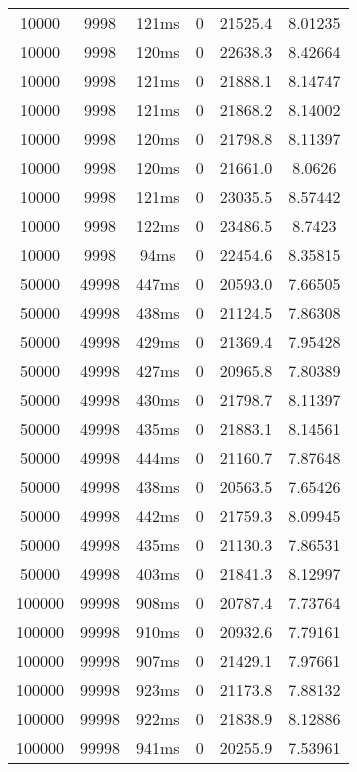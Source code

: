 \documentclass[./main.tex]{subfiles}
\begin{document}
\begin{table}
\begin{tabular}{ c | c | c | c | c | c }
        10000 & 9998 & 121ms & 0 & 21525.4 & 8.01235 \\
        10000 & 9998 & 120ms & 0 & 22638.3 & 8.42664 \\
        10000 & 9998 & 121ms & 0 & 21888.1 & 8.14747 \\
        10000 & 9998 & 121ms & 0 & 21868.2 & 8.14002 \\
        10000 & 9998 & 120ms & 0 & 21798.8 & 8.11397 \\
        10000 & 9998 & 120ms & 0 & 21661.0 & 8.0626 \\
        10000 & 9998 & 121ms & 0 & 23035.5 & 8.57442 \\
        10000 & 9998 & 122ms & 0 & 23486.5 & 8.7423 \\
        \rowcolor{lightgray} 10000 & 9998 & 94ms & 0 & 22454.6 & 8.35815 \\
        \hline
        50000 & 49998 & 447ms & 0 & 20593.0 & 7.66505 \\
        50000 & 49998 & 438ms & 0 & 21124.5 & 7.86308 \\
        50000 & 49998 & 429ms & 0 & 21369.4 & 7.95428 \\
        50000 & 49998 & 427ms & 0 & 20965.8 & 7.80389 \\
        50000 & 49998 & 430ms & 0 & 21798.7 & 8.11397 \\
        50000 & 49998 & 435ms & 0 & 21883.1 & 8.14561 \\
        \rowcolor{lightgray} 50000 & 49998 & 444ms & 0 & 21160.7 & 7.87648 \\
        50000 & 49998 & 438ms & 0 & 20563.5 & 7.65426 \\
        50000 & 49998 & 442ms & 0 & 21759.3 & 8.09945 \\
        50000 & 49998 & 435ms & 0 & 21130.3 & 7.86531 \\
        50000 & 49998 & 403ms & 0 & 21841.3 & 8.12997 \\
        \hline
        100000 & 99998 & 908ms & 0 & 20787.4 & 7.73764 \\
        100000 & 99998 & 910ms & 0 & 20932.6 & 7.79161 \\
        100000 & 99998 & 907ms & 0 & 21429.1 & 7.97661 \\
        \rowcolor{lightgray} 100000 & 99998 & 923ms & 0 & 21173.8 & 7.88132 \\
        100000 & 99998 & 922ms & 0 & 21838.9 & 8.12886 \\
        100000 & 99998 & 941ms & 0 & 20255.9 & 7.53961 \\

\end{tabular}
\end{table}
\end{document}

